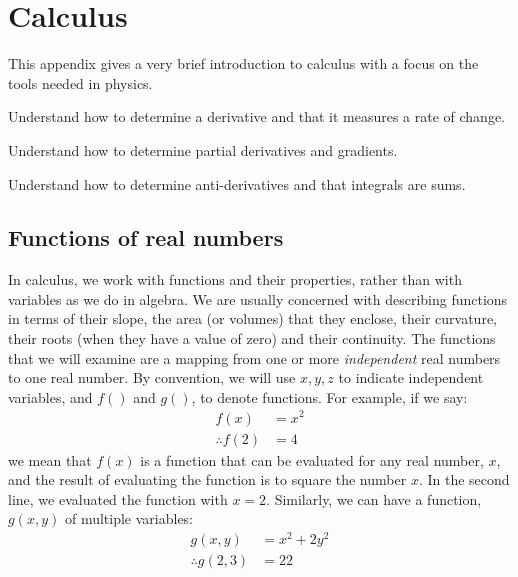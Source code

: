 %
\chapter{Calculus}
\label{calculus}
This appendix gives a very brief introduction to calculus with a focus on the tools needed in physics. 
 \vspace{1cm}
\begin{learningObjectives}
{
\item Understand how to determine a derivative and that it measures a rate of change.
\item Understand how to determine partial derivatives and gradients.
\item Understand how to determine anti-derivatives and that integrals are sums.
}
\end{learningObjectives}

\section{Functions of real numbers}
In calculus, we work with functions and their properties, rather than with variables as we do in algebra. We are usually concerned with describing functions in terms of their slope, the area (or volumes) that they enclose, their curvature, their roots (when they have a value of zero) and their continuity. The functions that we will examine are a mapping from one or more \textit{independent} real numbers to one real number. By convention, we will use $x,y,z$ to indicate independent variables, and $f()$ and $g()$, to denote functions. For example, if we say:
\begin{align*}
f(x) &= x^2\\
\therefore f(2) &= 4
\end{align*}
we mean that $f(x)$ is a function that can be evaluated for any real number, $x$, and the result of evaluating the function is to square the number $x$. In the second line, we evaluated the function with $x=2$. Similarly, we can have a function, $g(x,y)$ of multiple variables:
\begin{align*}
g(x,y)&=x^2+2y^2\\
\therefore g(2,3)&=22
\end{align*}

